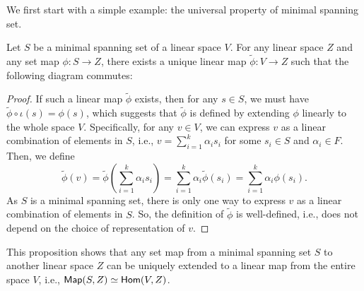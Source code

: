 We first start with a simple example: the universal property of minimal spanning set.

\begin{proposition}\label{prop:universal_property_minimal_spanning_set}
  Let $S$ be a minimal spanning set of a linear space $V$. For any linear space $Z$ and any set map $\phi \colon S \to Z$, there exists a unique linear map $\widetilde{\phi} \colon V \to Z$ such that the following diagram commutes:
  \begin{center}
  \end{center}
\end{proposition}
\begin{proof}
  If such a linear map $\widetilde{\phi}$ exists, then for any $s \in S$, we must have $\widetilde{\phi} \circ \iota (s) = \phi(s)$, which suggests that $\widetilde{\phi}$ is defined by extending $\phi$ linearly to the whole space $V$. Specifically, for any $v \in V$, we can express $v$ as a linear combination of elements in $S$, i.e., $v = \sum_{i=1}^k \alpha_i s_i$ for some $s_i \in S$ and $\alpha_i \in F$. Then, we define
  \[
    \widetilde{\phi}(v) = \widetilde{\phi}\left( \sum_{i=1}^k \alpha_i s_i \right) = \sum_{i=1}^k \alpha_i \widetilde{\phi}(s_i) = \sum_{i=1}^k \alpha_i \phi(s_i).
  \]
  As $S$ is a minimal spanning set, there is only one way to express $v$ as a linear combination of elements in $S$. So, the definition of $\widetilde{\phi}$ is well-defined, i.e., does not depend on the choice of representation of $v$.
\end{proof}

This proposition shows that any set map from a minimal spanning set $S$ to another linear space $Z$ can be uniquely extended to a linear map from the entire space $V$, i.e., $\operatorname{\text{\normalfont\sffamily Map}}(S, Z) \simeq \operatorname{\text{\normalfont\sffamily Hom}}(V, Z)$.

